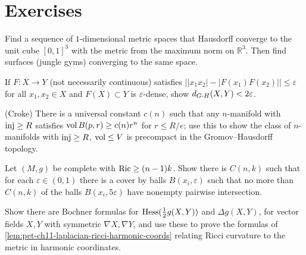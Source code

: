 \section{Exercises}

\begin{remark}[Exercise 11.6.1]
  \label{rem:pet-ch11-exercise-11-6-1}
  Find a sequence of $1$-dimensional metric spaces that Hausdorff converge to
  the unit cube $[0,1]^3$ with the metric from the maximum norm on
  $\mathbb{R}^3$. Then find surfaces (jungle gyms) converging to the same
  space.
\end{remark}

\begin{remark}[Exercise 11.6.2]
  \label{rem:pet-ch11-exercise-11-6-2}
  If $F:X\to Y$ (not necessarily continuous) satisfies
  $\big||x_1x_2|-|F(x_1)F(x_2)|\big|\le\varepsilon$ for all $x_1,x_2\in X$ and
  $F(X)\subset Y$ is $\varepsilon$-dense, show $d_{G\text{-}H}(X,Y)<2\varepsilon$.
\end{remark}

\begin{remark}[Exercise 11.6.3]
  \label{rem:pet-ch11-exercise-11-6-3}
  (Croke) There is a universal constant $c(n)$ such that any $n$-manifold
  with $\operatorname{inj}\ge R$ satisfies $\operatorname{vol} B(p,r)\ge c(n)r^n$ for $r\le R/e$; use this
  to show the class of $n$-manifolds with $\operatorname{inj}\ge R$, $\operatorname{vol}\le V$ is
  precompact in the Gromov--Hausdorff topology.
\end{remark}

\begin{remark}[Exercise 11.6.4]
  \label{rem:pet-ch11-exercise-11-6-4}
  Let $(M,g)$ be complete with $\operatorname{Ric}\ge(n-1)k$. Show there is
  $C(n,k)$ such that for each $\varepsilon\in(0,1)$ there is a cover by balls
  $B(x_i,\varepsilon)$ such that no more than $C(n,k)$ of the balls
  $B(x_i,5\varepsilon)$ have nonempty pairwise intersection.
\end{remark}

\begin{remark}[Exercise 11.6.5]
  \label{rem:pet-ch11-exercise-11-6-5}
  Show there are Bochner formulas for $\operatorname{Hess}(\tfrac12g(X,Y))$ and
  $\Delta g(X,Y)$, for vector fields $X,Y$ with symmetric $\nabla X,\nabla Y$,
  and use these to prove the formulas of
  \cref{lem:pet-ch11-laplacian-ricci-harmonic-coords} relating Ricci
  curvature to the metric in harmonic coordinates.
\end{remark}

